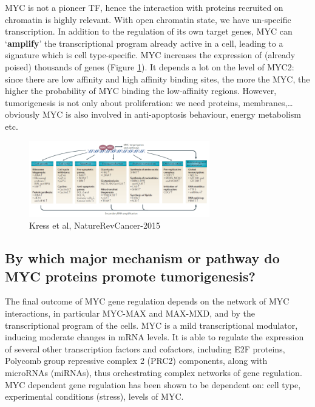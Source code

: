 MYC is not a pioneer TF, hence the interaction with proteins recruited on chromatin is highly relevant.
With open chromatin state, we have un-specific transcription. In addition to the regulation of its own target genes, MYC can `\textbf{amplify}' the transcriptional program already active in a cell, leading to a signature which is cell type-specific. MYC increases the expression of (already poised) thousands of genes (Figure \ref{fig:ppmyc}). It depends a lot on the level of MYC2: since there are low affinity and high affinity binding sites, the more the MYC, the higher the probability of MYC binding the low-affinity regions.  However, tumorigenesis is not only about proliferation: we need proteins, membranes,\ldots{} obviously MYC is also involved in anti-apoptosis behaviour, energy metabolism etc.

\begin{figure}
\centering
\includegraphics[width=0.7\textwidth]{../_resources/cdb9692b7dd2ca7bcfae696cd1b1ce36.png}
\caption{Kress et al, NatureRevCancer-2015}
\label{fig:ppmyc}
\end{figure}

\hypertarget{by-which-major-mechanism-or-pathway-myc-proteins-promote-tumorigenesis}{%
\subsection{By which major mechanism or pathway do MYC proteins promote tumorigenesis?}\label{by-which-major-mechanism-or-pathway-myc-proteins-promote-tumorigenesis}}

The final outcome of MYC gene regulation depends on the network of MYC interactions, in particular MYC-MAX
and MAX-MXD, and by the transcriptional program of the cells.
MYC is a mild transcriptional modulator, inducing moderate changes in mRNA levels.
It is able to regulate the expression of several other transcription factors and cofactors, including E2F proteins,
Polycomb group repressive complex 2 (PRC2) components, along with microRNAs (miRNAs), thus orchestrating
complex networks of gene regulation.
MYC dependent gene regulation has been shown to be dependent on: cell type, experimental conditions (stress),
levels of MYC.

